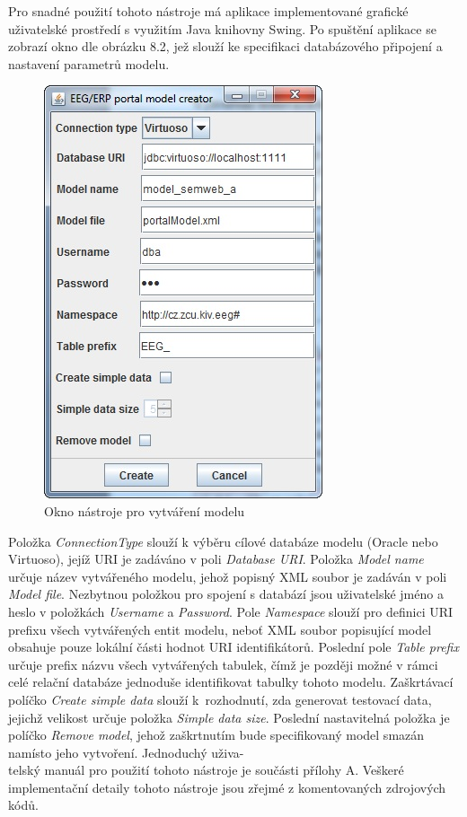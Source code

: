 \documentclass{projekt}
\begin{document}
Pro snadné použití tohoto nástroje má aplikace implementované grafické uživatelské prostředí s využitím Java knihovny Swing. Po spuštění aplikace se zobrazí okno dle obrázku 8.2, jež slouží ke specifikaci databázového připojení a nastavení parametrů modelu.


\begin{figure}[htb]
\begin{center}
\includegraphics[scale=0.8]{Creator.jpg}
\caption{Okno nástroje pro vytváření modelu}
\end{center}
\end{figure}

Položka {\it ConnectionType} slouží k výběru cílové databáze modelu (Oracle nebo Virtuoso), jejíž URI je zadáváno v poli {\it Database URI}. Položka {\it Model name} určuje název vytvářeného modelu, jehož popisný XML soubor je zadáván v poli {\it Model file}. Nezbytnou položkou pro spojení s databází jsou uživatelské jméno a heslo v položkách {\it Username} a {\it Password}. Pole {\it Namespace} slouží pro definici URI prefixu všech vytvářených entit modelu, neboť XML soubor popisující model obsahuje pouze lokální části hodnot URI identifikátorů. Poslední pole {\it Table prefix} určuje prefix názvu všech vytvářených tabulek, čímž je později možné v rámci celé relační databáze jednoduše identifikovat tabulky tohoto modelu. 
Zaškrtávací políčko {\it Create simple data} slouží k~rozhodnutí, zda generovat testovací data, jejichž velikost určuje položka {\it Simple data size}. Poslední nastavitelná položka je políčko {\it Remove model}, jehož zaškrtnutím bude specifikovaný model smazán namísto jeho vytvoření.
Jednoduchý uživa-\\telský manuál pro použití tohoto nástroje je součásti přílohy A. Veškeré implementační detaily tohoto nástroje jsou zřejmé z komentovaných zdrojových kódů.
\end{document}
